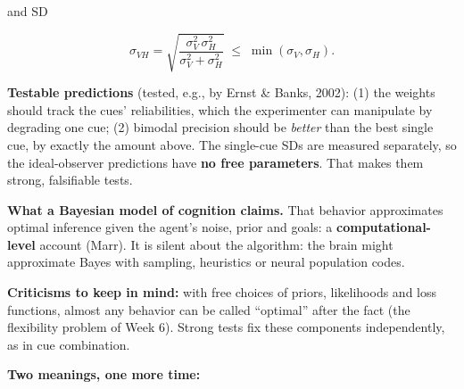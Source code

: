 and SD

\[
\sigma_{VH} = \sqrt{\frac{\sigma_V^2\,\sigma_H^2}{\sigma_V^2 + \sigma_H^2}} \;\le\; \min(\sigma_V, \sigma_H).
\]

\textbf{Testable predictions} (tested, e.g., by Ernst \& Banks, 2002):
(1) the weights should track the cues' reliabilities, which the
experimenter can manipulate by degrading one cue; (2) bimodal precision
should be \emph{better} than the best single cue, by exactly the amount
above. The single-cue SDs are measured separately, so the ideal-observer
predictions have \textbf{no free parameters}. That makes them strong,
falsifiable tests.

\textbf{What a Bayesian model of cognition claims.} That behavior
approximates optimal inference given the agent's noise, prior and goals:
a \textbf{computational-level} account (Marr). It is silent about the
algorithm: the brain might approximate Bayes with sampling, heuristics
or neural population codes.

\textbf{Criticisms to keep in mind:} with free choices of priors,
likelihoods and loss functions, almost any behavior can be called
``optimal'' after the fact (the flexibility problem of Week 6). Strong
tests fix these components independently, as in cue combination.

\textbf{Two meanings, one more time:}

